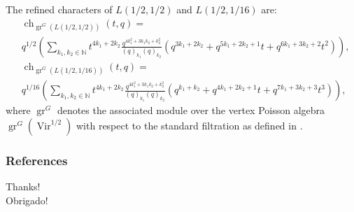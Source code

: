 \documentclass{beamer}
\DeclareMathOperator{\Vir}{Vir}
\DeclareMathOperator{\gr}{gr}
\DeclareMathOperator{\ch}{ch}
\begin{document}
\begin{frame}

  \begin{corollary}
    \label{crl:1}
    The refined characters of $L(1/2, 1/2)$ and $L(1/2, 1/16)$ are:
    \footnotesize
    \begin{align*}
      &\ch_{\gr^G(L(1/2, 1/2))}(t, q) = \\
      &q^{1/2}\left(\sum_{k_1, k_2 \in \mathbb{N}}t^{4k_1 + 2k_2}\frac{q^{4k_1^2 + 3k_1k_2 + k_2^2}}{(q)_{k_1}(q)_{k_2}}(q^{3k_1 + 2k_2} + q^{5k_1 + 2k_2 + 1}t + q^{6k_1 + 3k_2 + 2}t^2)\right), \\
      &\ch_{\gr^G(L(1/2, 1/16))}(t, q) = \\
      &q^{1/16}\left(\sum_{k_1, k_2 \in \mathbb{N}}t^{4k_1 + 2k_2}\frac{q^{4k_1^2 + 3k_1k_2 + k_2^2}}{(q)_{k_1}(q)_{k_2}}(q^{k_1 + k_2} + q^{4k_1 + 2k_2 + 1}t + q^{7k_1 + 3k_2 + 3}t^3)\right),
    \end{align*}
    \normalsize
    where $\gr^G$ denotes the associated module over the vertex Poisson algebra $\gr^G(\Vir^{1/2})$ with respect to the standard filtration as defined in \cite{salazar_pbw_2023}.
  \end{corollary}

\end{frame}

\begin{frame}[allowframebreaks]
  \frametitle{References}

  \footnotesize
  
  

\end{frame}

\begin{frame}

  \begin{center}
    \Huge
    Thanks! \\
    Obrigado!
  \end{center}

\end{frame}
\end{document}
